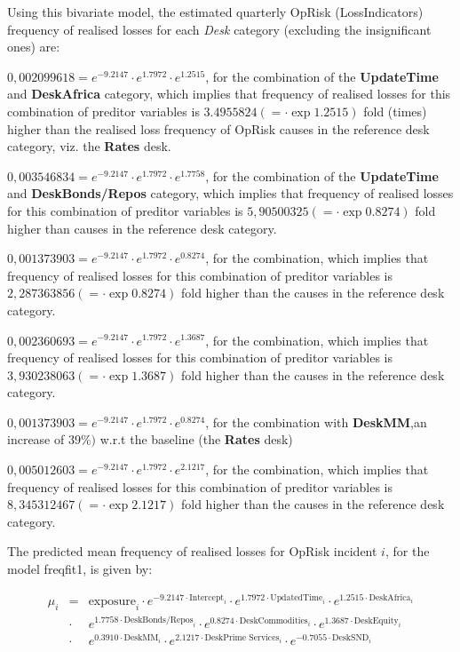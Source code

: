 \documentclass[]{DissertateUSU}
\begin{document}
\doublespacing
Using this bivariate model, the estimated quarterly OpRisk
(LossIndicators) frequency of realised losses for each \emph{Desk}
category (excluding the insignificant ones) are:

\begin{list}{*}{}
\item $0,002099618  = e^{-9.2147}\cdot e^{1.7972}\cdot e^{1.2515}$, for the combination of the \textbf{UpdateTime} and \textbf{DeskAfrica} category, which implies that frequency of realised losses for this combination of preditor variables is $3.4955824(=\cdot\exp{1.2515})$ fold (times) higher than the realised loss frequency of OpRisk causes in the reference desk category, viz. the \textbf{Rates} desk. 
\item $0,003546834 = e^{-9.2147}\cdot e^{1.7972}\cdot e^{1.7758}$, for the combination of the \textbf{UpdateTime} and \textbf{DeskBonds/Repos} category, which implies that frequency of realised losses for this combination of preditor variables is $5,90500325(=\cdot\exp{0.8274})$ fold higher than causes in the reference desk category.
\item $0,001373903 = e^{-9.2147}\cdot e^{1.7972}\cdot e^{0.8274}$, for the combination, which implies that frequency of realised losses for this combination of preditor variables is $2,287363856(=\cdot\exp{0.8274})$ fold higher than the causes in the reference desk category.
\item $0,002360693= e^{-9.2147}\cdot e^{1.7972}\cdot e^{1.3687}$, for the combination, which implies that frequency of realised losses for this combination of preditor variables is $3,930238063(=\cdot\exp{1.3687})$ fold higher than the causes in the reference desk category.
\item $0,001373903 = e^{-9.2147}\cdot e^{1.7972}\cdot e^{0.8274}$, for the combination with \textbf{DeskMM},an increase of $39\%)$ w.r.t the baseline (the \textbf{Rates} desk)
\item $0,005012603= e^{-9.2147}\cdot e^{1.7972}\cdot e^{2.1217}$, for the combination, which implies that frequency of realised losses for this combination of preditor variables is $8,345312467(=\cdot\exp{2.1217})$ fold higher than the causes in the reference desk category.
\end{list}

The predicted mean frequency of realised losses for OpRisk incident
\(i\), for the model freqfit1, is given by:

\singlespacing

\begin{eqnarray}
\mu_{i}& = &\mbox{exposure}_i\cdot e^{-9.2147\cdot \mbox{Intercept}_i}\cdot e^{1.7972\cdot \mbox{UpdatedTime}_i}\cdot e^{1.2515\cdot \mbox{DeskAfrica}_i}\nonumber\\
&\cdot&e^{1.7758\cdot \mbox{DeskBonds/Repos}_i}\cdot e^{0.8274\cdot \mbox{DeskCommodities}_i}\cdot e^{1.3687\cdot \mbox{DeskEquity}_i}\nonumber\\
&\cdot& e^{0.3910\cdot \mbox{DeskMM}_i}\cdot e^{2.1217\cdot \mbox{DeskPrime Services}_i}\cdot e^{-0.7055\cdot \mbox{DeskSND}_i}
\end{eqnarray}
\end{document}
